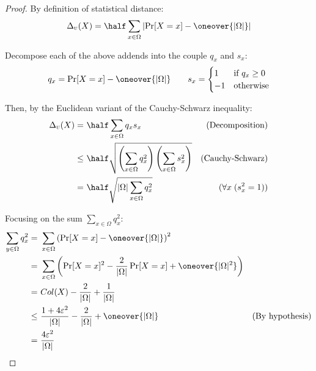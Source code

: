 \begin{proof}
    By definition of statistical distance:
    \[
        \sdtu(X) = \half \sum_{x \in \Omega} \left| \Pr[X = x] - \oneover{|\Omega|} \right|
    \]

    Decompose each of the above addends into the couple $q_x$ and $s_x$:
    \[
        q_x = \Pr[X = x] - \oneover{|\Omega|} \qquad s_x =
        \begin{cases}
            1  & \text{if $q_x \geq 0$} \\
            -1 & \text{otherwise}
        \end{cases}
    \]
    
    Then, by the Euclidean variant of the Cauchy-Schwarz inequality:
    \begin{align*}
        \sdtu(X) =&\ \half \sum_{x \in \Omega} q_x s_x                                                                & \text{(Decomposition)}     \\
              \leq&\ \half \sqrt{ \left( \sum_{x \in \Omega} q_x^2 \right) \left( \sum_{x \in \Omega} s_x^2 \right) } & \text{(Cauchy-Schwarz)}    \\
                 =&\ \half \sqrt{|\Omega| \sum_{x \in \Omega} q_x^2}                                                  & (\forall x \; (s_x^2 = 1)) \\
    \end{align*}

    Focusing on the sum $\sum_{x \in \Omega} q_x^2$:
    \begin{align*}
        \sum_{y \in \Omega} q_x^2 =&\ \sum_{x \in \Omega} \left( \Pr[X = x] - \oneover{|\Omega|} \right)^2                                   &                        \\
                                  =&\ \sum_{x \in \Omega} \left( \Pr[X = x]^2 - \frac{2}{|\Omega|} \Pr[X = x] + \oneover{|\Omega|^2} \right) &                        \\
                                  =&\ Col(X) - \frac{2}{|\Omega|} + \frac{1}{|\Omega|}                                                       &                        \\
                               \leq&\ \frac{1 + 4 \varepsilon^2}{|\Omega|} - \frac{2}{|\Omega|} + \oneover{|\Omega|}                         & \text{(By hypothesis)} \\
                                  =&\ \frac{4 \varepsilon^2}{|\Omega|}                                                                       &                        \\
    \end{align*}


\end{proof}
